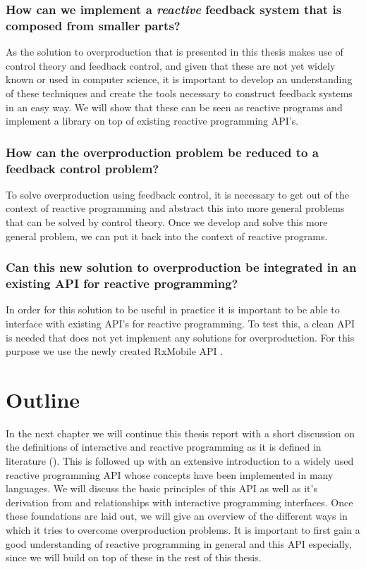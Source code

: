 \subsubsection*{How can we implement a \emph{reactive} feedback system that is composed from smaller parts?} 
As the solution to overproduction that is presented in this thesis makes use of control theory and feedback control, and given that these are not yet widely known or used in computer science, it is important to develop an understanding of these techniques and create the tools necessary to construct feedback systems in an easy way. We will show that these can be seen as reactive programs and implement a library on top of existing reactive programming API's.

\subsubsection*{How can the overproduction problem be reduced to a feedback control problem?}
To solve overproduction using feedback control, it is necessary to get out of the context of reactive programming and abstract this into more general problems that can be solved by control theory. Once we develop and solve this more general problem, we can put it back into the context of reactive programs.

\subsubsection*{Can this new solution to overproduction be integrated in an existing API for reactive programming?}
In order for this solution to be useful in practice it is important to be able to interface with existing API's for reactive programming. To test this, a clean API is needed that does not yet implement any solutions for overproduction. For this purpose we use the newly created RxMobile API \cite{RxMobile}.

\section*{Outline}
In the next chapter we will continue this thesis report with a short discussion on the definitions of interactive and reactive programming as it is defined in literature (). This is followed up with an extensive introduction to a widely used reactive programming API whose concepts have been implemented in many languages. We will discuss the basic principles of this API as well as it's derivation from and relationships with interactive programming interfaces. Once these foundations are laid out, we will give an overview of the different ways in which it tries to overcome overproduction problems. It is important to first gain a good understanding of reactive programming in general and this API especially, since we will build on top of these in the rest of this thesis.

